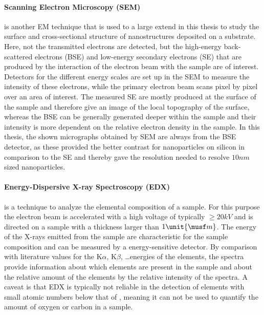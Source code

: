 \documentclass[\main/dresen_thesis.tex]{subfiles}
\begin{document}
    \paragraph{Scanning Electron Microscopy (SEM)}
      is another EM technique that is used to a large extend in this thesis to study the surface and cross-sectional structure of nanostructures deposited on a substrate.
      Here, not the transmitted electrons are detected, but the high-energy back-scattered electrons (BSE) and low-energy secondary electrons (SE) that are produced by the interaction of the electron beam with the sample are of interest.
      Detectors for the different energy scales are set up in the SEM to measure the intensity of these electrons, while the primary electron beam scans pixel by pixel over an area of interest.
      The measured SE are mostly produced at the surface of the sample and therefore give an image of the local topography of the surface, whereas the BSE can be generally generated deeper within the sample and their intensity is more dependent on the relative electron density in the sample.
      In this thesis, the shown micrographs obtained by SEM are always from the BSE detector, as these provided the better contrast for nanoparticles on silicon in comparison to the SE and thereby gave the resolution needed to resolve $10 \unit{nm}$ sized nanoparticles.

    \paragraph{Energy-Dispersive X-ray Spectroscopy (EDX)}
      is a technique to analyze the elemental composition of a sample.
      For this purpose the electron beam is accelerated with a high voltage of typically $\geq 20 \unit{kV}$ and is directed on a sample with a thickness larger than $1 \unit{\musf m}$.
      The energy of the X-rays emitted from the sample are characteristic for the sample composition and can be measured by a energy-sensitive detector.
      By comparison with literature values for the K$\alpha$, K$\beta$, \ldots energies of the elements, the spectra provide information about which elements are present in the sample and about the relative amount of the elements by the relative intensity of the spectra.
      A caveat is that EDX is typically not reliable in the detection of elements with small atomic numbers below that of , meaning it can not be used to quantify the amount of oxygen or carbon in a sample.
\end{document}
